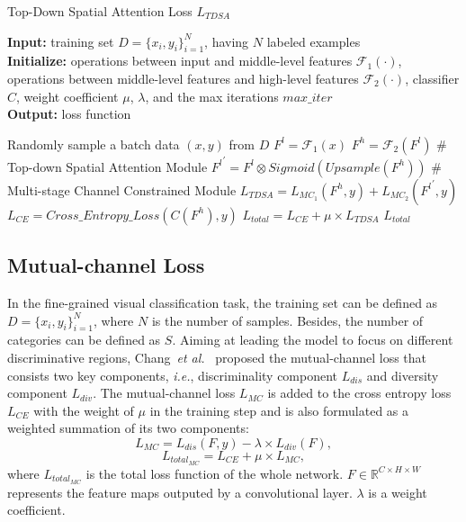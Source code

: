 \documentclass[journal]{IEEEtran}
\begin{document}
\begin{algorithm}[t]
  \caption{Top-Down Spatial Attention Loss $L_{TDSA}$}
  \hspace*{0.0in} {\bf Input:}
  training set $D = \{x_i, y_i\}_{i=1}^N$, having $N$ labeled examples \\
  \hspace*{0.0in} {\bf Initialize:} 
  operations between input and middle-level features $\mathcal{F}_1(\cdot)$, operations between middle-level features and high-level features $\mathcal{F}_2(\cdot)$, classifier $C$, weight coefficient $\mu$, $\lambda$, and the max iterations $max\_iter$\\
  \hspace*{0.0in} {\bf Output:} 
  loss function
  \begin{algorithmic}[1]
    \State Randomly sample a batch data $(x, y)$ from $D$
    \State $F^l = \mathcal{F}_1(x)$
    \State $F^h = \mathcal{F}_2(F^l)$
    \State \# Top-down Spatial Attention Module
    \State ${F^l}^{\prime} = F^l \otimes Sigmoid(Upsample(F^h))$
    \State \# Multi-stage Channel Constrained Module
    \State $L_{TDSA} = L_{{MC}_1}(F^h,y) +  L_{{MC}_2}({F^l}^{\prime},y)$
    \State $L_{CE} = Cross\_Entropy\_Loss(C(F^h),y)$
    \State $L_{total} = L_{CE} + {\mu} \times L_{TDSA}$
    \State \Return  $L_{total}$
    \EndFor
  \end{algorithmic}
\label{alg:method}
\end{algorithm}



\subsection{Mutual-channel Loss}\label{section:Mutual-channel Loss}
In the fine-grained visual classification task,
the training set can be defined as $D = \{x_i, y_i\}_{i=1}^N$, where $N$ is the number of samples. Besides, the number of categories can be defined as $S$. Aiming at leading the model to focus on different discriminative regions, Chang~\emph{{et al.}}~\cite{chang2020mc} proposed the mutual-channel loss that consists two key components, \emph{i.e.}, discriminality component $L_{dis}$ and diversity component $L_{div}$. The mutual-channel loss $L_{MC}$ is added to the cross entropy loss $L_{CE}$ with the weight of $\mu$ in the training step and is also formulated as a weighted summation of its two components:
\begin{equation}
L_{MC} = L_{dis}(F, y) - \lambda \times L_{div}(F),
\end{equation}
\begin{equation}
L_{total_{MC}} = L_{CE} + \mu \times L_{MC},
\end{equation}
where $L_{total_{MC}}$ is the total loss function of the whole network. $F \in \mathbb{R}^{C \times H \times W}$ represents the feature maps outputed by a convolutional layer. $\lambda$ is a weight coefficient.
\end{document}

